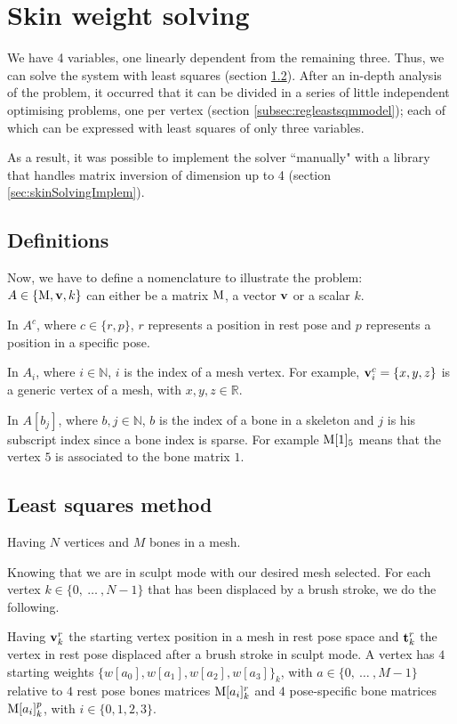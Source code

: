 \documentclass[12pt,twoside]{report}
\begin{document}
\section{Skin weight solving}
\label{sec:skinSolvingMethod}
We have 4 variables, one linearly dependent from the remaining three. Thus, we can solve the system with least squares (section \ref{subsec:leastsquaremodel}). After an in-depth analysis of the problem, it occurred that it can be divided in a series of little independent optimising problems, one per vertex (section \ref{subsec:regleastsqmmodel}); each of which can be expressed with least squares of only three variables.

As a result, it was possible to implement the solver ``manually" with a library that handles matrix inversion of dimension up to 4 (section \ref{sec:skinSolvingImplem}).

\subsection{Definitions}
Now, we have to define a nomenclature to illustrate the problem:\\ $A \in \{\mathrm{M}, \boldsymbol{ \mathrm{v} }, k\}$ can either be a matrix $\mathrm{M}$, a vector $\boldsymbol{ \mathrm{v} }$ or a scalar $k$.

In $A^c$, where $c \in \{r, p\}$, $r$ represents a position in rest pose and $p$ represents a position in a specific pose.

In $A_i$, where $i \in \mathbb{N}$, $i$ is the index of a mesh vertex. For example, $\boldsymbol{ \mathrm{v} }_i^c  = \{x, y, z\}$ is a generic vertex of a mesh, with $x, y, z \in \mathbb{R}$.

In $A[b_j]$, where $b, j \in \mathbb{N}$, $b$ is the index of a bone in a skeleton and $j$ is his subscript index since a bone index is sparse. For example $\mathrm{M}[1]_5$ means that the vertex $5$ is associated to the bone matrix $1$.

\subsection{Least squares method}
\label{subsec:leastsquaremodel}
Having $N$ vertices and $M$ bones in a mesh.

Knowing that we are in sculpt mode with our desired mesh selected. For each vertex $k \in \{0,\ \dots\ , N-1\}$ that has been displaced by a brush stroke, we do the following.

Having $\boldsymbol{ \mathrm{v} }_k^r$ the starting vertex position in a mesh in rest pose space and $\boldsymbol{ \mathrm{t} }_k^r$ the vertex in rest pose displaced after a brush stroke in sculpt mode. A vertex has $4$ starting weights $\{w[a_0], w[a_1], w[a_2], w[a_3]\}_k$, with $a \in \{0,\ \dots\ , M-1\}$ relative to $4$ rest pose bones matrices $\mathrm{M}[a_i]_k^r$ and $4$ pose-specific bone matrices $\mathrm{M}[a_i]_k^p$, with $i \in \{0,1,2,3\}$.
\end{document}
